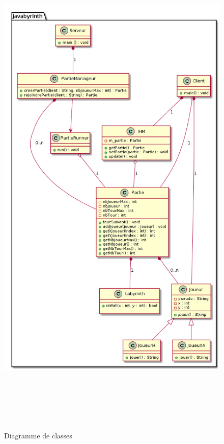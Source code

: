 \begin{figure}[h]%
	\centering
	\includegraphics[height=25cm]{images/UML_diagClass.png}%
	\caption{Diagramme de classes}%
	\label{fig:diagClass}%
\end{figure}